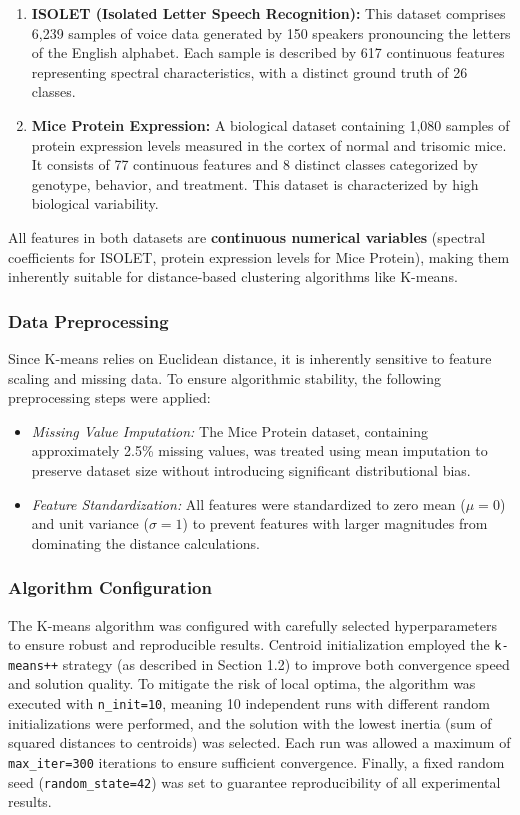 \documentclass[12pt]{article}
\begin{document}
\begin{enumerate}
    \item \textbf{ISOLET (Isolated Letter Speech Recognition):} This dataset comprises 6,239 samples of voice data generated by 150 speakers pronouncing the letters of the English alphabet. Each sample is described by 617 continuous features representing spectral characteristics, with a distinct ground truth of 26 classes.
    \item \textbf{Mice Protein Expression:} A biological dataset containing 1,080 samples of protein expression levels measured in the cortex of normal and trisomic mice. It consists of 77 continuous features and 8 distinct classes categorized by genotype, behavior, and treatment. This dataset is characterized by high biological variability.
\end{enumerate}

All features in both datasets are \textbf{continuous numerical variables} (spectral coefficients for ISOLET, protein expression levels for Mice Protein), making them inherently suitable for distance-based clustering algorithms like K-means.

\subsubsection{Data Preprocessing}
Since K-means relies on Euclidean distance, it is inherently sensitive to feature scaling and missing data. To ensure algorithmic stability, the following preprocessing steps were applied:

\begin{itemize}
    \item \textit{Missing Value Imputation:} The Mice Protein dataset, containing approximately 2.5\% missing values, was treated using mean imputation to preserve dataset size without introducing significant distributional bias.
    \item \textit{Feature Standardization:} All features were standardized to zero mean ($\mu=0$) and unit variance ($\sigma=1$) to prevent features with larger magnitudes from dominating the distance calculations.
\end{itemize}

\subsubsection{Algorithm Configuration}
The K-means algorithm was configured with carefully selected hyperparameters to ensure robust and reproducible results. Centroid initialization employed the \texttt{k-means++} strategy (as described in Section 1.2) to improve both convergence speed and solution quality. To mitigate the risk of local optima, the algorithm was executed with \texttt{n\_init=10}, meaning 10 independent runs with different random initializations were performed, and the solution with the lowest inertia (sum of squared distances to centroids) was selected. Each run was allowed a maximum of \texttt{max\_iter=300} iterations to ensure sufficient convergence. Finally, a fixed random seed (\texttt{random\_state=42}) was set to guarantee reproducibility of all experimental results.
\end{document}
